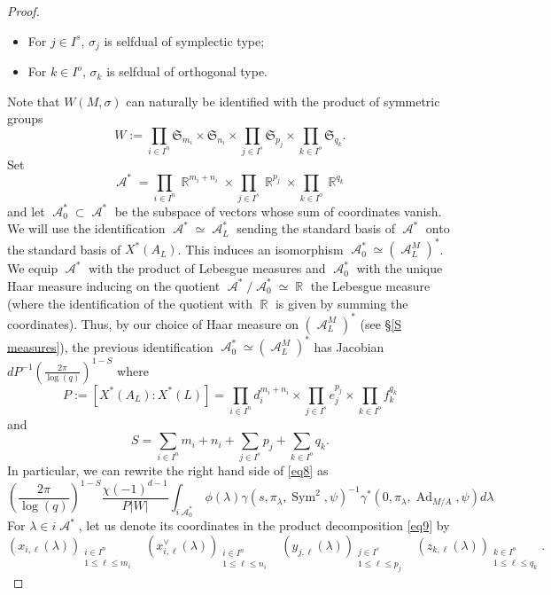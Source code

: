 \documentclass[12pt]{article}
\numberwithin{equation}{section}
\DeclareMathOperator{\Ad}{Ad}
\DeclareMathOperator{\cA}{\mathcal{A}}
\DeclareMathOperator{\bR}{\mathbb{R}}
\DeclareMathOperator{\Sym}{Sym}
\begin{document}
\begin{proof}
\begin{itemize}
			\item For $j\in I^s$, $\sigma_j$ is selfdual of symplectic type;
			
			\item For $k\in I^o$, $\sigma_k$ is selfdual of orthogonal type.
		\end{itemize}
		Note that $W(M,\sigma)$ can naturally be identified with the product of symmetric groups
		$$\displaystyle W:=\prod_{i\in I^n} \mathfrak{S}_{m_i}\times \mathfrak{S}_{n_i}\times \prod_{j\in I^s} \mathfrak{S}_{p_j}\times \prod_{k\in I^o} \mathfrak{S}_{q_k}.$$
		Set
		\begin{equation}\label{eq9}
			\cA^*=\prod_{i\in I^n} \bR^{m_i+n_i}\times \prod_{j\in I^s} \bR^{p_j}\times \prod_{k\in I^o} \bR^{q_k}
		\end{equation}
		and let $\cA_0^*\subset \cA^*$ be the subspace of vectors whose sum of coordinates vanish. We will use the identification $\cA^*\simeq \cA_L^*$ sending the standard basis of $\cA^*$ onto the standard basis of $X^*(A_L)$. This induces an isomorphism $\cA_0^*\simeq (\cA_L^M)^*$. We equip $\cA^*$ with the product of Lebesgue measures and $\cA_0^*$ with the unique Haar measure inducing on the quotient $\cA^*/\cA_0^*\simeq \bR$ the Lebesgue measure (where the identification of the quotient with $\bR$ is given by summing the coordinates). Thus, by our choice of Haar measure on $(\cA_L^M)^*$ (see \S \ref{S measures}), the previous identification $\cA_0^*\simeq (\cA_L^M)^*$ has Jacobian $dP^{-1}\left(\frac{2\pi}{\log(q)}\right)^{1-S}$ where
		$$\displaystyle P:=[X^*(A_L):X^*(L)]=\prod_{i\in I^n} d_i^{m_i+n_i}\times \prod_{j\in I^s} e_j^{p_j}\times \prod_{k\in I^o} f_k^{q_k}$$
		and
		$$S=\sum_{i\in I^n} m_i+n_i+\sum_{j\in I^s} p_j +\sum_{k\in I^o} q_k.$$
		In particular, we can rewrite the right hand side of \eqref{eq8} as
		\begin{equation}\label{eq12}
			\displaystyle \left(\frac{2\pi}{\log(q)}\right)^{1-S}\frac{\chi(-1)^{d-1}}{P \lvert W\rvert}\int_{i\cA_0^*} \phi(\lambda) \gamma(s,\pi_\lambda,\Sym^2,\psi)^{-1} \gamma^*(0,\pi_\lambda, \Ad_{M/A},\psi)d\lambda
		\end{equation}
		For $\lambda\in i\cA^*$, let us denote its coordinates in the product decomposition \eqref{eq9} by
		$$\displaystyle (x_{i,\ell}(\lambda))_{\substack{i\in I^n \\ 1\leq \ell\leq m_i}} \;\;\; (x^\vee_{i,\ell}(\lambda))_{\substack{i\in I^n \\ 1\leq \ell\leq n_i}}\;\;\; (y_{j,\ell}(\lambda))_{\substack{j\in I^s \\ 1\leq \ell\leq p_j}}\;\;\; (z_{k,\ell}(\lambda))_{\substack{k\in I^o \\ 1\leq \ell\leq q_k}}.$$

\end{proof}
\end{document}
